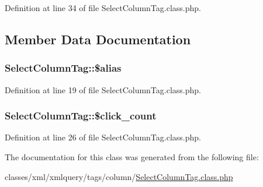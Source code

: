 Definition at line 34 of file Select\+Column\+Tag.\+class.\+php.



\subsection{Member Data Documentation}
\hypertarget{classSelectColumnTag_a152fca9e152d65e4697ad823ffaa101b}{}
\subsubsection[{\$alias}]{\setlength{\rightskip}{0pt plus 5cm}Select\+Column\+Tag\+::\$alias}\label{classSelectColumnTag_a152fca9e152d65e4697ad823ffaa101b}


Definition at line 19 of file Select\+Column\+Tag.\+class.\+php.

\hypertarget{classSelectColumnTag_a5965b8a6c68685c6b99dd88f4fd87f52}{}
\subsubsection[{\$click\+\_\+count}]{\setlength{\rightskip}{0pt plus 5cm}Select\+Column\+Tag\+::\$click\+\_\+count}\label{classSelectColumnTag_a5965b8a6c68685c6b99dd88f4fd87f52}


Definition at line 26 of file Select\+Column\+Tag.\+class.\+php.



The documentation for this class was generated from the following file\+:\begin{DoxyCompactItemize}
\item 
classes/xml/xmlquery/tags/column/\hyperlink{SelectColumnTag_8class_8php}{Select\+Column\+Tag.\+class.\+php}\end{DoxyCompactItemize}

